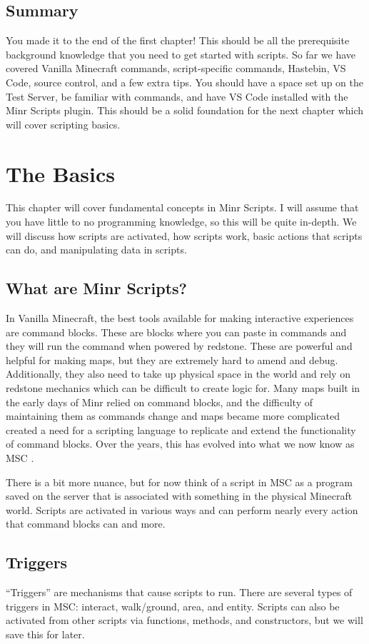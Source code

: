 \documentclass[oneside]{book}
\begin{document}
\section{Summary}
You made it to the end of the first chapter! This should be all the prerequisite background knowledge that you need to get started with scripts. So far we have covered Vanilla Minecraft commands, script-specific commands, Hastebin, VS Code, source control, and a few extra tips. You should have a space set up on the Test Server, be familiar with commands, and have VS Code installed with the Minr Scripts plugin. This should be a solid foundation for the next chapter which will cover scripting basics.

\chapter{The Basics}

This chapter will cover fundamental concepts in Minr Scripts. I will assume that you have little to no programming knowledge, so this will be quite in-depth. We will discuss how scripts are activated, how scripts work, basic actions that scripts can do, and manipulating data in scripts.

\section{What are Minr Scripts?}
In Vanilla Minecraft, the best tools available for making interactive experiences are command blocks. These are blocks where you can paste in commands and they will run the command when powered by redstone. These are powerful and helpful for making maps, but they are extremely hard to amend and debug. Additionally, they also need to take up physical space in the world and rely on redstone mechanics which can be difficult to create logic for. Many maps built in the early days of Minr relied on command blocks, and the difficulty of maintaining them as commands change and maps became more complicated created a need for a scripting language to replicate and extend the functionality of command blocks. Over the years, this has evolved into what we now know as MSC \mscv.

There is a bit more nuance, but for now think of a script in MSC as a program saved on the server that is associated with something in the physical Minecraft world. Scripts are activated in various ways and can perform nearly every action that command blocks can and more.

\section{Triggers} \label{sec:triggers}
``Triggers'' are mechanisms that cause scripts to run. There are several types of triggers in MSC: interact, walk/ground, area, and entity. Scripts can also be activated from other scripts via functions, methods, and constructors, but we will save this for later.
\end{document}

